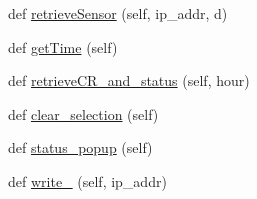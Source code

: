 \begin{DoxyCompactItemize}
\item 
def \hyperlink{classTestingGUI_1_1Health_afde04eeef599765553cce6069cff429e}{retrieve\+Sensor} (self, ip\+\_\+addr, d)
\item 
def \hyperlink{classTestingGUI_1_1Health_ad38efcab164d7bbb4ec16c2086dc7760}{get\+Time} (self)
\item 
def \hyperlink{classTestingGUI_1_1Health_a3a6e2fca0c7a691527b14c79b388f6fd}{retrieve\+C\+R\+\_\+and\+\_\+status} (self, hour)
\item 
def \hyperlink{classTestingGUI_1_1Health_a1e3b9ff5f630c5f6d47bfefe26cfb39b}{clear\+\_\+selection} (self)
\item 
def \hyperlink{classTestingGUI_1_1Health_a06c77fae7dd08337985a3420a2cdbc81}{status\+\_\+popup} (self)
\item 
def \hyperlink{classTestingGUI_1_1Health_a73ccf83145b4adf9452f85a061c23dc9}{write\+\_\+} (self, ip\+\_\+addr)
\end{DoxyCompactItemize}
